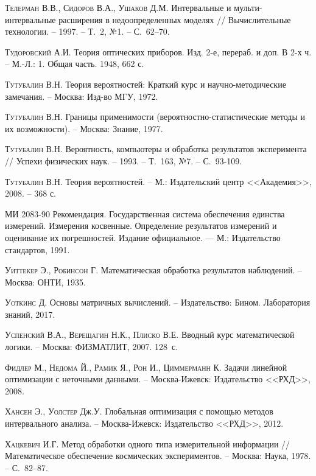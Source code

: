 \documentclass[a5paper,openany]{book}
\begin{document}
\begin{thebibliography}{999}
\textsc{Телерман В.В., Сидоров В.А., Ушаков Д.М.} Интервальные и мульти-интервальные 
расширения в недоопределенных моделях // Вычислительные технологии. -- 1997. -- Т.~2, №1.
-- С.~62--70. 
  
\textsc{Тудоровский А.И.} Теория оптических приборов. Изд. 2-е, перераб. и доп. 
В 2-х ч. --  М.-Л.: 1. Общая часть. 1948, 662 с. 
    
\textsc{Тутубалин В.Н.} Теория вероятностей: Краткий курс и научно-методические 
замечания. -- Москва: Изд-во МГУ, 1972. 
  
\textsc{Тутубалин В.Н.} Границы применимости (вероятностно-статистические методы и их
возможности). -- Москва: Знание, 1977. 
  
\textsc{Тутубалин В.Н.} Вероятность, компьютеры и обработка результатов эксперимента // 
Успехи физических наук. -- 1993. -- Т.~163, №7. -- С.~93-109. 
  
\textsc{Тутубалин В.Н.} Теория вероятностей. -- М.: Издательский центр <<Академия>>, 
2008. -- 368 с. 
  
МИ 2083-90 Рекомендация. Государственная система обеспечения единства измерений. 
Измерения косвенные. Определение результатов измерений и оценивание их погрешностей. 
Издание официальное. --- М.: Издательство стандартов, 1991. 
  
\textsc{Уиттекер Э., Робинсон Г.} Математическая обработка результатов наблюдений. 
-- Москва: ОНТИ, 1935. 
  
\textsc{Уоткинс Д.} Основы матричных вычислений. -- Издательство: Бином. Лаборатория 
знаний, 2017. 
  
\textsc{Успенский В.А., Верещагин Н.К., Плиско В.Е.} Вводный курс математической логики. 
-- Москва: ФИЗМАТЛИТ, 2007. 128~с.
  
\textsc{Фидлер М., Недома Й., Рамик Я., Рон И., Циммерманн К.} Задачи линейной оптимизации 
с неточными данными. -- Москва-Ижевск: Издательство <<РХД>>, 2008. 
  
\textsc{Хансен Э., Уолстер Дж.У.} Глобальная оптимизация с помощью методов интервального 
анализа. -- Москва-Ижевск: Издательство <<РХД>>, 2012. 
  
\textsc{Хацкевич И.Г.} Метод обработки одного типа измерительной информации //   
Математическое обеспечение космических экспериментов. -- Москва: Наука, 1978. 
-- С.~82--87. 
  

\end{thebibliography}
\end{document}

